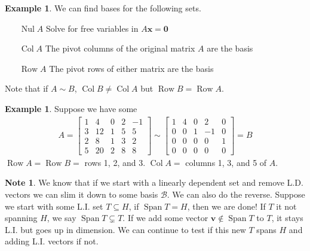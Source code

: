 \documentclass{article}
\numberwithin{equation}{section}
\theoremstyle{definition}
\newtheorem{ex}[thm]{Example}
\newtheorem{note}{Note}[subsection]
\newcommand{\V}{\mathbf{v}}
\DeclareMathOperator{\nul}{Nul}
\DeclareMathOperator{\spa}{Span}
\DeclareMathOperator{\row}{Row}
\DeclareMathOperator{\col}{Col}
\theoremstyle{adefn}
\begin{document}
	\begin{ex}
		We can find bases for the following sets. 
		\begin{enumerate}[leftmargin=1cm]
			\itemsep0em
			\item[$\nul A$] Solve for free variables in $A\mathbf{x} = \mathbf{0}$
			\item[$\col A$] The pivot columns of the original matrix $A$ are the basis
			\item[$\row A$] The pivot rows of either matrix are the basis
		\end{enumerate}
		Note that if $A \sim B$, $\col B \neq \col A$ but $\row B = \row A$. 
	\end{ex}
	\begin{ex}
		Suppose we have some
		\begin{align*}
			A = \begin{bmatrix}
				1 & 4 & 0 & 2 & -1 \\
				3 & 12 & 1 & 5 & 5 \\ 
				2 & 8 & 1 & 3 & 2 \\ 
				5 & 20 & 2 & 8 & 8
			\end{bmatrix} \sim \begin{bmatrix}
				1 & 4 & 0 & 2 & 0 \\ 
				0 & 0 & 1 & -1 & 0 \\
				0 & 0 & 0 & 0 & 1 \\ 
				0 & 0 & 0 & 0 & 0
			\end{bmatrix} = B
		\end{align*}
		$\row A = \row B = $ rows 1, 2, and 3. $\col A = $ columns 1, 3, and 5 of $A$. 
	\end{ex}
	\begin{note}
		We know that if we start with a linearly dependent set and remove L.D. vectors we can slim it down to some basis $\mathcal{B}$. We can also do the reverse. Suppose we start with some L.I. set $T \subseteq H$, if $\spa T = H$, then we are done! If $T$ it not spanning $H$, we say $\spa T \subsetneq T$. If we add some vector $\V \notin \spa T$ to $T$, it stays L.I. but goes up in dimension. We can continue to test if this new $T$ spans $H$ and adding L.I. vectors if not. 
	\end{note}
	
\end{document}
